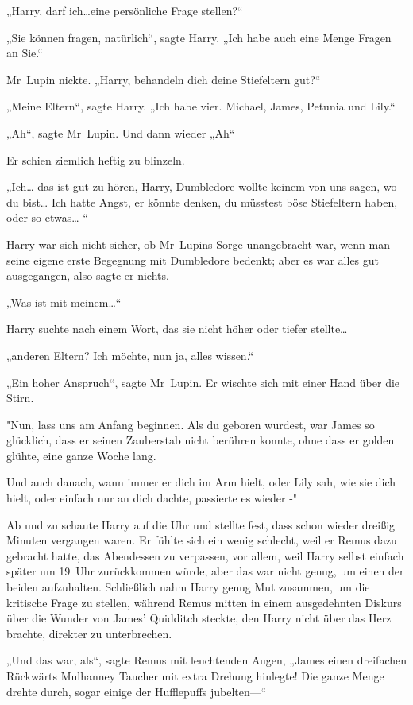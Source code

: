{„Harry, darf ich…eine persönliche Frage stellen?“

„Sie können fragen, natürlich“, sagte Harry. „Ich habe auch eine Menge Fragen an Sie.“

Mr~Lupin nickte. „Harry, behandeln dich deine Stiefeltern gut?“

„Meine Eltern“, sagte Harry. „Ich habe vier. Michael, James, Petunia und Lily.“

„Ah“, sagte Mr~Lupin. Und dann wieder „Ah“

Er schien ziemlich heftig zu blinzeln.

„Ich… das ist gut zu hören, Harry, Dumbledore wollte keinem von uns sagen, wo du bist… Ich hatte Angst, er könnte denken, du müsstest böse Stiefeltern haben, oder so etwas… “

Harry war sich nicht sicher, ob Mr~Lupins Sorge unangebracht war, wenn man seine eigene erste Begegnung mit Dumbledore bedenkt; aber es war alles gut ausgegangen, also sagte er nichts.

„Was ist mit meinem…“

Harry suchte nach einem Wort, das sie nicht höher oder tiefer stellte…

„anderen Eltern? Ich möchte, nun ja, alles wissen.“

„Ein hoher Anspruch“, sagte Mr~Lupin. Er wischte sich mit einer Hand über die Stirn.

"Nun, lass uns am Anfang beginnen. Als du geboren wurdest, war James so glücklich, dass er seinen Zauberstab nicht berühren konnte, ohne dass er golden glühte, eine ganze Woche lang.

Und auch danach, wann immer er dich im Arm hielt, oder Lily sah, wie sie dich hielt, oder einfach nur an dich dachte, passierte es wieder -"

Ab und zu schaute Harry auf die Uhr und stellte fest, dass schon wieder dreißig Minuten vergangen waren. Er fühlte sich ein wenig schlecht, weil er Remus dazu gebracht hatte, das Abendessen zu verpassen, vor allem, weil Harry selbst einfach später um 19~Uhr zurückkommen würde, aber das war nicht genug, um einen der beiden aufzuhalten. Schließlich nahm Harry genug Mut zusammen, um die kritische Frage zu stellen, während Remus mitten in einem ausgedehnten Diskurs über die Wunder von James' Quidditch steckte, den Harry nicht über das Herz brachte, direkter zu unterbrechen.

„Und das war, als“, sagte Remus mit leuchtenden Augen, „James einen dreifachen Rückwärts Mulhanney Taucher mit extra Drehung hinlegte! Die ganze Menge drehte durch, sogar einige der Hufflepuffs jubelten—“

}
